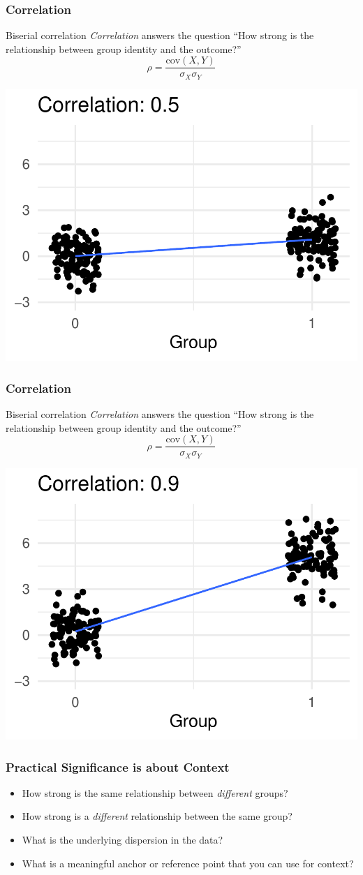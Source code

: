 \documentclass[12pt, block=fill]{beamer}
\newcommand{\cov}{\text{cov}}
\begin{document}
\begin{frame}
  \frametitle{Correlation}

  \begin{block}{Biserial correlation}
    \textit{Correlation} answers the question ``How strong
    is the relationship between group identity and the outcome?''
    \[
      \rho = \frac{\cov(X, Y)}{\sigma_{X}\sigma_{Y}}
    \]
  \end{block}

  \begin{center}
    \includegraphics[width = 0.4\linewidth]{./figures/biserial_05}
  \end{center}
\end{frame}

\begin{frame}
  \frametitle{Correlation}

  \begin{block}{Biserial correlation}
    \textit{Correlation} answers the question ``How strong
    is the relationship between group identity and the outcome?''
    \[
      \rho = \frac{\cov(X, Y)}{\sigma_{X}\sigma_{Y}}
    \]
  \end{block}

  \begin{center}
    \includegraphics[width = 0.4\linewidth]{./figures/biserial_09}
  \end{center}
\end{frame}

\begin{frame}
  \frametitle{Practical Significance is about Context}

  \begin{itemize}
  \item How strong is the same relationship between \textit{different}
    groups?
  \item How strong is a \textit{different} relationship between the
    same group?
  \item What is the underlying dispersion in the data?
  \item What is a meaningful anchor or reference point that you can
    use for context?
  \end{itemize}
\end{frame}
\end{document}
